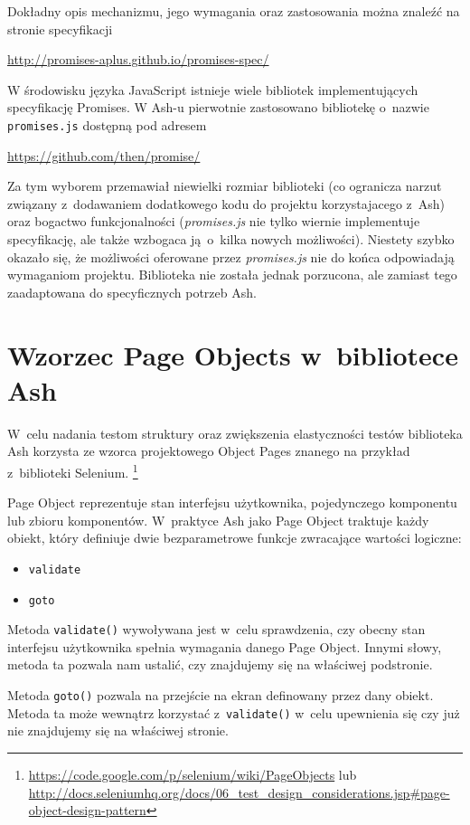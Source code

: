 \documentclass[brudnopis]{xmgr}
\begin{document}
Dokładny opis mechanizmu, jego wymagania oraz zastosowania można znaleźć na  stronie specyfikacji

\url{http://promises-aplus.github.io/promises-spec/}

W środowisku języka JavaScript istnieje wiele bibliotek implementujących specyfikację Promises. W Ash-u pierwotnie zastosowano bibliotekę o~nazwie \texttt{promises.js} dostępną pod adresem

\url{https://github.com/then/promise/}

Za tym wyborem przemawiał niewielki rozmiar biblioteki (co ogranicza narzut związany z~dodawaniem dodatkowego kodu do projektu korzystajacego z~Ash) oraz bogactwo funkcjonalności (\textit{promises.js} nie tylko wiernie implementuje specyfikację, ale także wzbogaca ją~o~kilka nowych możliwości). Niestety szybko okazało się, że możliwości oferowane przez \textit{promises.js} nie do końca odpowiadają wymaganiom projektu. Biblioteka nie została jednak porzucona, ale zamiast tego zaadaptowana do specyficznych potrzeb Ash.  

\section{Wzorzec Page Objects w~bibliotece Ash}

W~celu nadania testom struktury oraz zwiększenia elastyczności testów biblioteka Ash korzysta ze wzorca projektowego Object Pages znanego na przykład z~biblioteki Selenium. 
\footnote{ \url{https://code.google.com/p/selenium/wiki/PageObjects}
lub
\url{http://docs.seleniumhq.org/docs/06\_test\_design\_considerations.jsp\#page-object-design-pattern} }

Page Object reprezentuje stan interfejsu użytkownika, pojedynczego komponentu lub zbioru komponentów. W~praktyce Ash jako Page Object traktuje każdy obiekt, który definiuje dwie bezparametrowe funkcje zwracające wartości logiczne:

\begin{itemize}
  \item \texttt{validate}
  \item \texttt{goto}
\end{itemize}

Metoda \texttt{validate()} wywoływana jest w~celu sprawdzenia, czy obecny stan interfejsu użytkownika spełnia wymagania danego Page Object. Innymi słowy, metoda ta pozwala nam ustalić, czy znajdujemy się na właściwej podstronie. 

Metoda \texttt{goto()} pozwala na przejście na ekran definowany przez dany obiekt. Metoda ta może wewnątrz korzystać z~\texttt{validate()} w~celu upewnienia się czy już nie znajdujemy się na właściwej stronie. 
\end{document}
